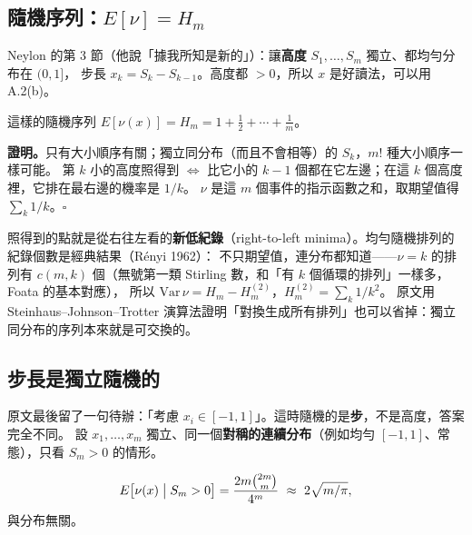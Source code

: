 \subsection{隨機序列：$E[\nu]=H_m$}

Neylon 的第 3 節（他說「據我所知是新的」）：讓\textbf{高度} $S_1,\ldots,S_m$ 獨立、都均勻分布在 $(0,1]$，
步長 $x_k=S_k-S_{k-1}$。高度都 $>0$，所以 $x$ 是好讀法，可以用 A.2(b)。

\begin{thmbox}[性質 7（Neylon）]
這樣的隨機序列 $E[\nu(x)]=H_m=1+\tfrac12+\cdots+\tfrac1m$。
\end{thmbox}

\textbf{證明。}只有大小順序有關；獨立同分布（而且不會相等）的 $S_k$，$m!$ 種大小順序一樣可能。
第 $k$ 小的高度照得到 $\iff$ 比它小的 $k-1$ 個都在它左邊；在這 $k$ 個高度裡，它排在最右邊的機率是 $1/k$。
$\nu$ 是這 $m$ 個事件的指示函數之和，取期望值得 $\sum_k 1/k$。\hfill$\square$

\begin{notebox}
照得到的點就是從右往左看的\textbf{新低紀錄}（right-to-left minima）。均勻隨機排列的紀錄個數是經典結果（Rényi 1962）：
不只期望值，連分布都知道——$\nu=k$ 的排列有 $c(m,k)$ 個（無號第一類 Stirling 數，和「有 $k$ 個循環的排列」一樣多，Foata 的基本對應），
所以 $\mathrm{Var}\,\nu=H_m-H_m^{(2)}$，$H_m^{(2)}=\sum_k 1/k^2$。
原文用 Steinhaus--Johnson--Trotter 演算法證明「對換生成所有排列」也可以省掉：獨立同分布的序列本來就是可交換的。
\end{notebox}

\begin{table}[H]
\centering\small
\RanNeyRecords
\caption{把 $1,\ldots,m$ 的 $m!$ 種排列當成高度，直接數 $\nu$：排列數正好是 $c(m,1),\ldots,c(m,m)$，平均是 $H_m$。}
\label{tab:neyrecords}
\end{table}

\subsection{步長是獨立隨機的 \extra}

原文最後留了一句待辦：「考慮 $x_i\in[-1,1]$」。這時隨機的是\textbf{步}，不是高度，答案完全不同。
設 $x_1,\ldots,x_m$ 獨立、同一個\textbf{對稱的連續分布}（例如均勻 $[-1,1]$、常態），只看 $S_m>0$ 的情形。

\begin{thmbox}
\[
E\bigl[\nu(x)\bigm| S_m>0\bigr]=\frac{2m\binom{2m}{m}}{4^m}\ \approx\ 2\sqrt{m/\pi},
\]
與分布無關。
\end{thmbox}


